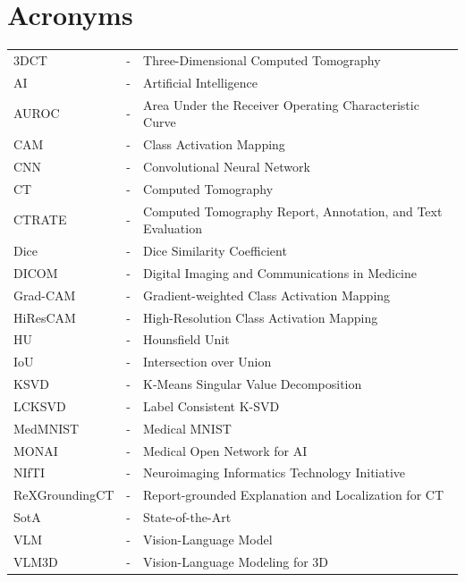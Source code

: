 ﻿\chapter*{Acronyms}

\noindent \begin{tabular}{lcl}
3DCT & - & Three-Dimensional Computed Tomography\\
AI & - & Artificial Intelligence\\
AUROC & - & Area Under the Receiver Operating Characteristic Curve\\
CAM & - & Class Activation Mapping\\
CNN & - & Convolutional Neural Network\\
CT & - & Computed Tomography\\
CTRATE & - & Computed Tomography Report, Annotation, and Text Evaluation\\
Dice & - & Dice Similarity Coefficient\\
DICOM & - & Digital Imaging and Communications in Medicine\\
Grad-CAM & - & Gradient-weighted Class Activation Mapping\\
HiResCAM & - & High-Resolution Class Activation Mapping\\
HU & - & Hounsfield Unit\\
IoU & - & Intersection over Union\\
KSVD & - & K-Means Singular Value Decomposition\\
LCKSVD & - & Label Consistent K-SVD\\
MedMNIST & - & Medical MNIST\\
MONAI & - & Medical Open Network for AI\\
NIfTI & - & Neuroimaging Informatics Technology Initiative\\
ReXGroundingCT & - & Report-grounded Explanation and Localization for CT\\
SotA & - & State-of-the-Art\\
VLM & - & Vision-Language Model\\
VLM3D & - & Vision-Language Modeling for 3D\\
\end{tabular} 


